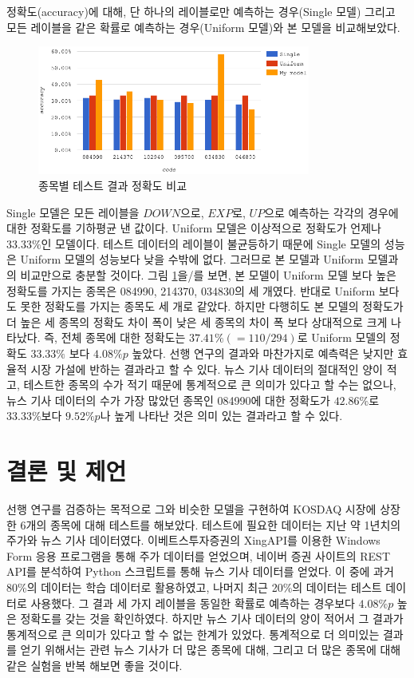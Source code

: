 \documentclass[a4paper,10pt]{article}
\begin{document}
정확도(accuracy)에 대해, 단 하나의 레이블로만 예측하는 경우(Single 모델) 그리고 모든 레이블을 같은 확률로 예측하는 경우(Uniform 모델)와 본 모델을 비교해보았다.
\begin{figure}[h]
\includegraphics[width=0.8\textwidth]{accuracy_comparison}
\centering
\caption{종목별 테스트 결과 정확도 비교}
\label{fig:accuracy_comparison}
\end{figure}
Single 모델은 모든 레이블을 $DOWN$으로, $EXP$로, $UP$으로 예측하는 각각의 경우에 대한 정확도를 기하평균 낸 값이다.
Uniform 모델은 이상적으로 정확도가 언제나 $33.33\%$인 모델이다.
테스트 데이터의 레이블이 불균등하기 때문에 Single 모델의 성능은 Uniform 모델의 성능보다 낮을 수밖에 없다.
그러므로 본 모델과 Uniform 모델과의 비교만으로 충분할 것이다.
그림 \ref{fig:accuracy_comparison}을/를 보면, 본 모델이 Uniform 모델 보다 높은 정확도를 가지는 종목은 084990, 214370, 034830의 세 개였다.
반대로 Uniform 보다도 못한 정확도를 가지는 종목도 세 개로 같았다.
하지만 다행히도 본 모델의 정확도가 더 높은 세 종목의 정확도 차이 폭이 낮은 세 종목의 차이 폭 보다 상대적으로 크게 나타났다.
즉, 전체 종목에 대한 정확도는 $37.41\% (= 110/294)$로 Uniform 모델의 정확도 $33.33\%$ 보다 $4.08\%p$ 높았다.
선행 연구의 결과와 마찬가지로 예측력은 낮지만 효율적 시장 가설에 반하는 결과라고 할 수 있다.
뉴스 기사 데이터의 절대적인 양이 적고, 테스트한 종목의 수가 적기 때문에 통계적으로 큰 의미가 있다고 할 수는 없으나,
뉴스 기사 데이터의 수가 가장 많았던 종목인 084990에 대한 정확도가 $42.86\%$로 $33.33\%$보다 $9.52\%p$나 높게 나타난 것은 의미 있는 결과라고 할 수 있다.

\section{결론 및 제언}

선행 연구를 검증하는 목적으로 그와 비슷한 모델을 구현하여 KOSDAQ 시장에 상장한 6개의 종목에 대해 테스트를 해보았다.
테스트에 필요한 데이터는 지난 약 1년치의 주가와 뉴스 기사 데이터였다.
이베트스투자증권의 XingAPI를 이용한 Windows Form 응용 프로그램을 통해 주가 데이터를 얻었으며,
네이버 증권 사이트의 REST API를 분석하여 Python 스크립트를 통해 뉴스 기사 데이터를 얻었다.
이 중에 과거 80\%의 데이터는 학습 데이터로 활용하였고, 나머지 최근 20\%의 데이터는 테스트 데이터로 사용했다.
그 결과 세 가지 레이블을 동일한 확률로 예측하는 경우보다 $4.08\%p$ 높은 정확도를 갖는 것을 확인하였다.
하지만 뉴스 기사 데이터의 양이 적어서 그 결과가 통계적으로 큰 의미가 있다고 할 수 없는 한계가 있었다.
통계적으로 더 의미있는 결과를 얻기 위해서는 관련 뉴스 기사가 더 많은 종목에 대해, 그리고 더 많은 종목에 대해 같은 실험을 반복 해보면 좋을 것이다.
\end{document}
